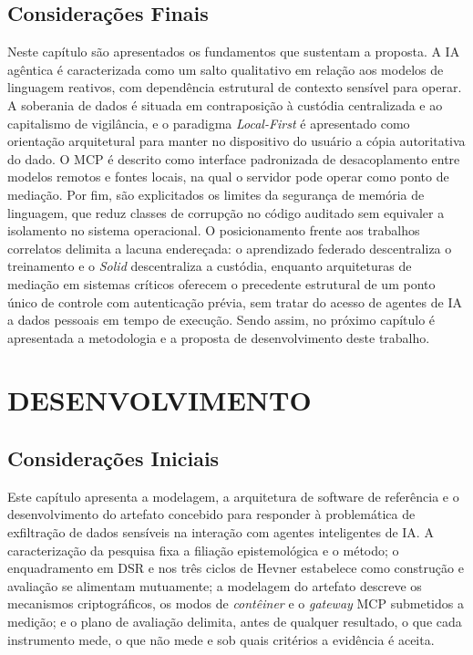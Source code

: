 \section{Considerações Finais}

Neste capítulo são apresentados os fundamentos que sustentam a proposta. A IA agêntica é caracterizada como um salto qualitativo em relação aos modelos de linguagem reativos, com dependência estrutural de contexto sensível para operar. A soberania de dados é situada em contraposição à custódia centralizada e ao capitalismo de vigilância, e o paradigma \textit{Local-First} é apresentado como orientação arquitetural para manter no dispositivo do usuário a cópia autoritativa do dado. O MCP é descrito como interface padronizada de desacoplamento entre modelos remotos e fontes locais, na qual o servidor pode operar como ponto de mediação. Por fim, são explicitados os limites da segurança de memória de linguagem, que reduz classes de corrupção no código auditado sem equivaler a isolamento no sistema operacional. O posicionamento frente aos trabalhos correlatos delimita a lacuna endereçada: o aprendizado federado descentraliza o treinamento e o \textit{Solid} descentraliza a custódia, enquanto arquiteturas de mediação em sistemas críticos oferecem o precedente estrutural de um ponto único de controle com autenticação prévia, sem tratar do acesso de agentes de IA a dados pessoais em tempo de execução. Sendo assim, no próximo capítulo é apresentada a metodologia e a proposta de desenvolvimento deste trabalho.

\chapter{DESENVOLVIMENTO}
\section{Considerações Iniciais}
Este capítulo apresenta a modelagem, a arquitetura de software de referência e o desenvolvimento do artefato concebido para responder à problemática de exfiltração de dados sensíveis na interação com agentes inteligentes de IA. A caracterização da pesquisa fixa a filiação epistemológica e o método; o enquadramento em DSR e nos três ciclos de Hevner estabelece como construção e avaliação se alimentam mutuamente; a modelagem do artefato descreve os mecanismos criptográficos, os modos de \textit{contêiner} e o \textit{gateway} MCP submetidos a medição; e o plano de avaliação delimita, antes de qualquer resultado, o que cada instrumento mede, o que não mede e sob quais critérios a evidência é aceita.


